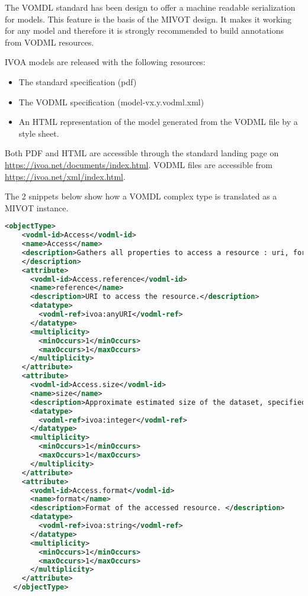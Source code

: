 The VOMDL standard has been design to offer a machine readable serialization for models. 
This feature is the basis of the MIVOT design. 
It makes it working for any model
and therefore it is strongly recommended to build annotations from VODML resources.

IVOA models are released with the following resources:
\begin{itemize}
    \item The standard specification (pdf)
    \item The VODML specification (model-vx.y.vodml.xml)
    \item An HTML representation of the model generated from the VODML file by a style sheet.    
\end{itemize}

Both PDF and HTML are accessible through the standard landing page
on \url{https://ivoa.net/documents/index.html}.
VODML files are accessible from \url{https://ivoa.net/xml/index.html}.

The 2 snippets below show how a VOMDL complex type is translated as a MIVOT instance.

\begin{lstlisting}[caption={VODML representation of the PhotDM class \texttt{Access}.
This is an object type with 3 attributes, each with a cardinality equal  to 1. 
At this stage, we do not know whether attributes are typed with a complex types 
or primitive types. This will come later by going through their own types.},language=XML]
  <objectType>
    <vodml-id>Access</vodml-id>
    <name>Access</name>
    <description>Gathers all properties to access a resource : uri, format and size . 
    </description>
    <attribute>
      <vodml-id>Access.reference</vodml-id>
      <name>reference</name>
      <description>URI to access the resource.</description>
      <datatype>
        <vodml-ref>ivoa:anyURI</vodml-ref>
      </datatype>
      <multiplicity>
        <minOccurs>1</minOccurs>
        <maxOccurs>1</maxOccurs>
      </multiplicity>
    </attribute>
    <attribute>
      <vodml-id>Access.size</vodml-id>
      <name>size</name>
      <description>Approximate estimated size of the dataset, specified in kilobytes.</description>
      <datatype>
        <vodml-ref>ivoa:integer</vodml-ref>
      </datatype>
      <multiplicity>
        <minOccurs>1</minOccurs>
        <maxOccurs>1</maxOccurs>
      </multiplicity>
    </attribute>
    <attribute>
      <vodml-id>Access.format</vodml-id>
      <name>format</name>
      <description>Format of the accessed resource. </description>
      <datatype>
        <vodml-ref>ivoa:string</vodml-ref>
      </datatype>
      <multiplicity>
        <minOccurs>1</minOccurs>
        <maxOccurs>1</maxOccurs>
      </multiplicity>
    </attribute>
  </objectType>
\end{lstlisting}  

